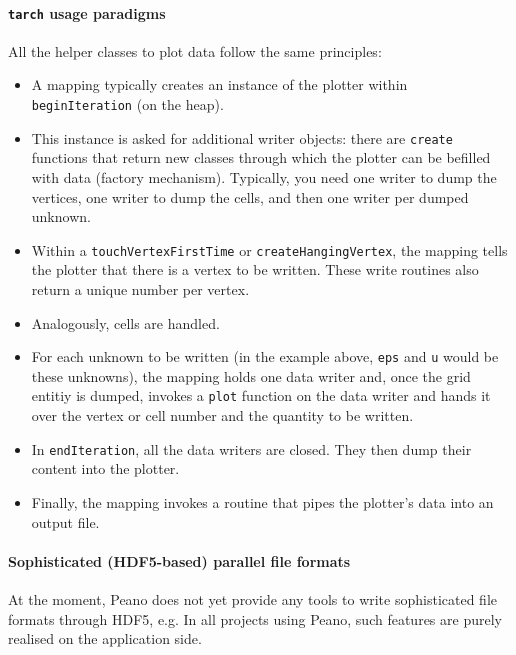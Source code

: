 \paragraph{\texttt{tarch} usage paradigms}
All the helper classes to plot data follow the same principles:
\begin{itemize}
  \item A mapping typically creates an instance of the plotter within
  \texttt{beginIteration} (on the heap).
  \item This instance is asked for additional writer objects: there are
  \texttt{create} functions that return new classes through which the plotter
  can be befilled with data (factory mechanism). Typically, you need one writer
  to dump the vertices, one writer to dump the cells, and then one writer per
  dumped unknown.
  \item Within a \texttt{touchVertexFirstTime} or \texttt{createHangingVertex},
  the mapping tells the plotter that there is a vertex to be written. These
  write routines also return a unique number per vertex.
  \item Analogously, cells are handled.
  \item For each unknown to be written (in the example above, \texttt{eps} and
  \texttt{u} would be these unknowns), the mapping holds one data writer and,
  once the grid entitiy is dumped, invokes a \texttt{plot} function on the data
  writer and hands it over the vertex or cell number and the quantity to be
  written.
  \item In \texttt{endIteration}, all the data writers are closed. They then
  dump their content into the plotter. 
  \item Finally, the mapping invokes a routine that pipes the plotter's data
  into an output file.
\end{itemize}


\paragraph{Sophisticated (HDF5-based) parallel file formats}
At the moment, Peano does not yet provide any tools to write sophisticated file
formats through HDF5, e.g.
In all projects using Peano, such features are purely realised on the
application side.
